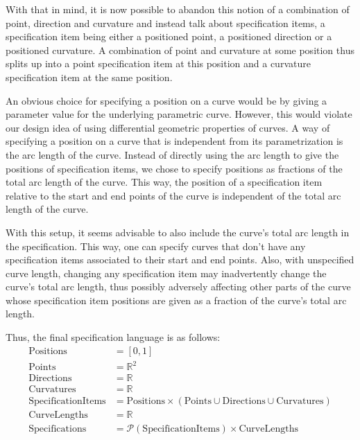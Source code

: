 \documentclass[a4paper]{article}
\begin{document}
				With that in mind, it is now possible to abandon this notion of a combination of point, direction and curvature and instead talk about specification items, a specification item being either a positioned point, a positioned direction or a positioned curvature. A combination of point and curvature at some position thus splits up into a point specification item at this position and a curvature specification item at the same position.

				An obvious choice for specifying a position on a curve would be by giving a parameter value for the underlying parametric curve. However, this would violate our design idea of using differential geometric properties of curves. A way of specifying a position on a curve that is independent from its parametrization is the arc length of the curve. Instead of directly using the arc length to give the positions of specification items, we chose to specify positions as fractions of the total arc length of the curve. This way, the position of a specification item relative to the start and end points of the curve is independent of the total arc length of the curve.

				With this setup, it seems advisable to also include the curve's total arc length in the specification. This way, one can specify curves that don't have any specification items associated to their start and end points. Also, with unspecified curve length, changing any specification item may inadvertently change the curve's total arc length, thus possibly adversely affecting other parts of the curve whose specification item positions are given as a fraction of the curve's total arc length.

				Thus, the final specification language is as follows:
				\begin{align*}
					\text{Positions} & = \left[0, 1\right]\\
					\text{Points} & = \mathbb{R}^2\\
					\text{Directions} & = \mathbb{R}\\
					\text{Curvatures} & = \mathbb{R}\\
					\text{SpecificationItems} & = \text{Positions} \times \left(\text{Points} \cup \text{Directions} \cup \text{Curvatures}\right)\\
					\text{CurveLengths} & = \mathbb{R}\\
					\text{Specifications} & = \mathcal{P}\left(\text{SpecificationItems}\right) \times \text{CurveLengths}
				\end{align*}
\end{document}
